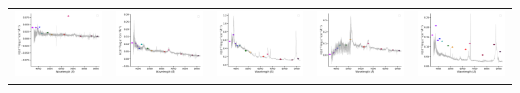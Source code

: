 \begin{center}
\begin{longtable}{l l l l l }
    \includegraphics[width=0.19\linewidth, clip]{Figs/Figs-sdss/spec-9180-57693-0928-STRIPE82-0121-040706.pdf} & \includegraphics[width=0.19\linewidth, clip]{Figs/Figs-sdss/spec-9217-57934-0197-STRIPE82-0143-016256.pdf} & \includegraphics[width=0.19\linewidth, clip]{Figs/Figs-sdss/spec-9217-57934-0839-STRIPE82-0143-016137.pdf} & \includegraphics[width=0.19\linewidth, clip]{Figs/Figs-sdss/spec-9218-57724-0804-STRIPE82-0145-045634.pdf} & \includegraphics[width=0.19\linewidth, clip]{Figs/Figs-sdss/spec-9230-58021-0675-STRIPE82-0125-053114.pdf} \\

\end{longtable}
\end{center}
